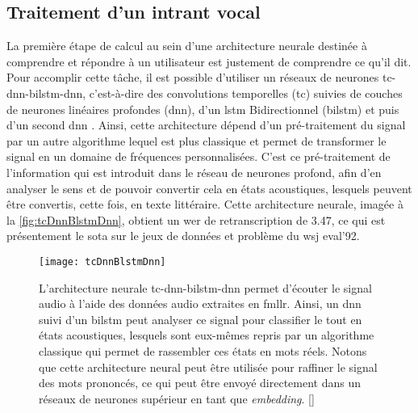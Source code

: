 \subsection{Traitement d'un intrant vocal}
La première étape de calcul au sein d’une architecture neurale destinée à comprendre et répondre à un utilisateur est justement de comprendre ce qu’il dit. Pour accomplir cette tâche, il est possible d’utiliser un réseaux de neurones \gls{tc}-\gls{dnn}-\gls{bilstm}-\gls{dnn}, c’est-à-dire des convolutions temporelles (\gls{tc}) suivies de couches de neurones linéaires profondes (\gls{dnn}), d’un \gls{lstm} Bidirectionnel (\gls{bilstm}) et puis d’un second \gls{dnn} \cite{acousticModeling}. Ainsi, cette architecture dépend d’un pré-traitement du signal par un autre algorithme lequel est plus classique et permet de transformer le signal en un domaine de fréquences personnalisées. C’est ce pré-traitement de l’information qui est introduit dans le réseau de neurones profond, afin d’en analyser le sens et de pouvoir convertir cela en états acoustiques, lesquels peuvent être convertis, cette fois, en texte littéraire. Cette architecture neurale, imagée à la \autoref{fig:tcDnnBlstmDnn}, obtient un \gls{wer} de retranscription de 3.47, ce qui est présentement le \gls{sota} sur le jeux de données et problème du \gls{wsj} eval’92.

\begin{figure*}
  \centering
  \texttt{[image: tcDnnBlstmDnn]}
  \caption{L’architecture neurale \gls{tc}-\gls{dnn}-\gls{bilstm}-\gls{dnn} permet d’écouter le signal audio à l’aide des données audio extraites en \gls{fmllr}. Ainsi, un \gls{dnn} suivi d’un \gls{bilstm} peut analyser ce signal pour classifier le tout en états acoustiques, lesquels sont eux-mêmes repris par un algorithme classique qui permet de rassembler ces états en mots réels. Notons que cette architecture neural peut être utilisée pour raffiner le signal des mots prononcés, ce qui peut être envoyé directement dans un réseaux de neurones supérieur en tant que \textit{embedding}. []}
  \label{fig:tcDnnBlstmDnn}
\end{figure*}
